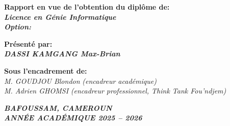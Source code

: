 \documentclass[12pt,a4paper,oneside]{article}
\newcommand{\Etudiant}{DASSI KAMGANG Max-Brian}
\newcommand{\Diplome}{Licence en Génie Informatique}
\newcommand{\Option}{}
\newcommand{\EncadreurAcad}{M. GOUDJOU Blondon}
\newcommand{\GradeAcad}{encadreur académique}
\newcommand{\EncadreurPro}{M. Adrien GHOMSI}
\newcommand{\GradePro}{encadreur professionnel, Think Tank Fou'ndjem}
\newcommand{\AnneeAcad}{2025 -- 2026}
\newcommand{\VillePays}{BAFOUSSAM, CAMEROUN}
\begin{document}
\begin{center}
  {\bfseries Rapport en vue de l'obtention du diplôme de:}\\[8pt]
  {\color{keyceblue}\itshape\bfseries\fontsize{13}{16}\selectfont \Diplome}%
  \ifx\Option\empty\else
    \\[5pt]{\color{keyceblue}\itshape\bfseries Option: \Option}%
  \fi

  \vspace{0.9cm}

  {\bfseries Présenté par:}\\[8pt]
  {\color{keyceblue}\itshape\bfseries\fontsize{13}{16}\selectfont \Etudiant}

  \vspace{0.9cm}

  {\bfseries Sous l'encadrement de:}\\[8pt]
  {\color{keyceblue}\itshape \EncadreurAcad} \textit{(\GradeAcad)}\\[4pt]
  {\color{keyceblue}\itshape \EncadreurPro} \textit{(\GradePro)}
\end{center}

\vfill

\begin{center}
  {\itshape\bfseries\fontsize{13}{16}\selectfont \VillePays}\\[8pt]
  {\itshape\bfseries\fontsize{13}{16}\selectfont
   ANNÉE ACADÉMIQUE \AnneeAcad}
\end{center}
\end{document}
